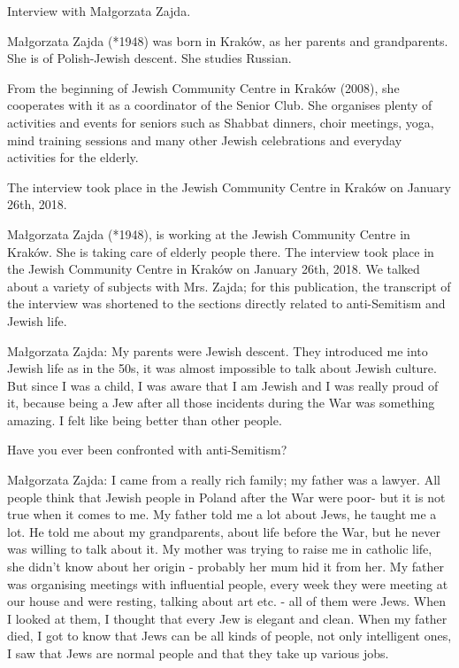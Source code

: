 Interview with Małgorzata Zajda. 

Małgorzata Zajda (*1948) was born in Kraków, as her parents and grandparents. She is of Polish-Jewish descent. She studies Russian.  

From the beginning of Jewish Community Centre in Kraków (2008), she cooperates with it as a coordinator of the Senior Club. She organises plenty of activities and events for seniors such as Shabbat dinners, choir meetings, yoga, mind training sessions and many other Jewish celebrations and everyday activities for the elderly.  

The interview took place in the Jewish Community Centre in Kraków on January 26th, 2018. 

Małgorzata Zajda (*1948), is working at the Jewish Community Centre in Kraków. She is taking care of elderly people there. 
The interview took place in the Jewish Community Centre in Kraków on January 26th, 2018. We talked about a variety of subjects with Mrs. Zajda; for this publication, the transcript of the interview was shortened to the sections directly related to anti-Semitism and Jewish life. 

Małgorzata Zajda: My parents were Jewish descent. They introduced me into Jewish life as in the 50s, it was almost impossible to talk about Jewish culture. But since I was a child, I was aware that I am Jewish and I was really proud of it, because being a Jew after all those incidents during the War was something amazing. I felt like being better than other people.  

Have you ever been confronted with anti-Semitism? 

Małgorzata Zajda: I came from a really rich family; my father was a lawyer. All people think that Jewish people in Poland after the War were poor- but it is not true when it comes to me. My father told me a lot about Jews, he taught me a lot. He told me about my grandparents, about life before the War, but he never was willing to talk about it. My mother was trying to raise me in catholic life, she didn't know about her origin - probably her mum hid it from her. My father was organising meetings with influential people, every week they were meeting at our house and were resting, talking about art etc. - all of them were Jews. When I looked at them, I thought that every Jew is elegant and clean. When my father died, I got to know that Jews can be all kinds of people, not only intelligent ones, I saw that Jews are normal people and that they take up various jobs. 

